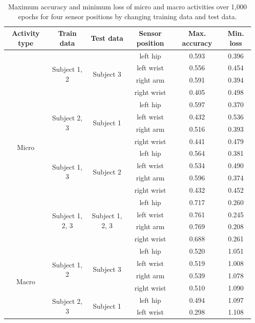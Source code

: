 \documentclass{svmult}
\begin{document}
\begin{table}[h]
    \centering
    \caption{Maximum accuracy and minimum loss of micro and macro activities over 1,000 epochs for four sensor positions by changing training data and test data.}
    \label{tab:result}
    \begin{tabular}{c|c|c|c|c|c}\hline\hline
         Activity type& Train data& Test data &Sensor position& Max. accuracy & Min. loss \\\hline
         \multirow{16}{*}{Micro}& \multirow{4}{*}{Subject 1, 2}& \multirow{4}{*}{Subject 3} & left hip&0.593&0.396\\
         &&&left wrist&0.556 &0.454\\
         &&&right arm&0.591 &0.394\\
         &&&right wrist&0.405 &0.498\\\cline{2-6}
         & \multirow{4}{*}{Subject 2, 3}& \multirow{4}{*}{Subject 1} & left hip&0.597 &0.370\\
         &&&left wrist&0.432 &0.536\\
         &&&right arm&0.516 &0.393\\
         &&&right wrist&0.441 &0.479\\\cline{2-6}
         & \multirow{4}{*}{Subject 1, 3}& \multirow{4}{*}{Subject 2} & left hip&0.564 &0.381\\
         &&&left wrist&0.534 &0.490\\
         &&&right arm&0.596 &0.374\\
         &&&right wrist&0.432 &0.452\\\cline{2-6}
         & \multirow{4}{*}{Subject 1, 2, 3}& \multirow{4}{*}{Subject 1, 2, 3} & left hip&0.717 &0.260\\
         &&&left wrist&0.761 &0.245\\
         &&&right arm&0.769 &0.208\\
         &&&right wrist&0.688 &0.261\\\hline
        \multirow{16}{*}{Macro}& \multirow{4}{*}{Subject 1, 2}& \multirow{4}{*}{Subject 3} & left hip&0.520 &1.051 \\
         &&&left wrist&0.519 &1.008\\
         &&&right arm&0.539 &1.078\\
         &&&right wrist&0.510 &1.090\\\cline{2-6}
         & \multirow{4}{*}{Subject 2, 3}& \multirow{4}{*}{Subject 1} & left hip&0.494 &1.097\\
         &&&left wrist&0.298 &1.108\\

\end{tabular}
\end{table}
\end{document}
